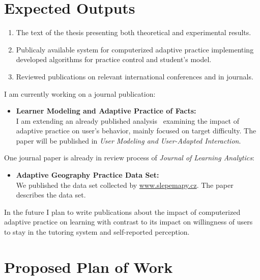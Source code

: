 \documentclass[table,color,cover,twoside,nolot,nolof]{fithesis3/fithesis3}
\begin{document}
\section{Expected Outputs}
\begin{enumerate}
	\item The text of the thesis presenting both theoretical and experimental
		results.
	\item Publicaly available system for computerized adaptive practice
		implementing developed algorithms for practice control and student's
		model.
	\item Reviewed publications on relevant international conferences and in
		journals.
\end{enumerate}

\noindent
I am currently working on a journal publication:

\begin{itemize}
	\item \textbf{Learner Modeling and Adaptive Practice of Facts:}\\
		I am extending an already published analysis~\cite{papousek2015impact}
		examining the impact of adaptive practice on user's behavior, mainly
		focused on target difficulty. The paper will be published in \emph{User
		Modeling and User-Adapted Interaction}.
\end{itemize}

One journal paper is already in review process of \emph{Journal of Learning
Analytics}:

\begin{itemize}
	\item \textbf{Adaptive Geography Practice Data Set:}\\
		We published the data set collected by \url{www.slepemapy.cz}. The paper
		describes the data set.
\end{itemize}

In the future I plan to write publications about the impact of computerized
adaptive practice on learning with contrast to its impact on willingness of
users to stay in the tutoring system and self-reported perception.

\section{Proposed Plan of Work}
\end{document}
